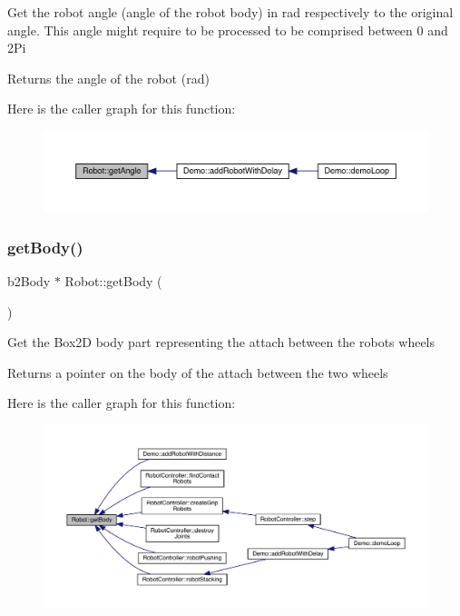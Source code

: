 Get the robot angle (angle of the robot body) in rad respectively to the original angle. This angle might require to be processed to be comprised between 0 and 2\+Pi \begin{DoxyReturn}{Returns}
the angle of the robot (rad) 
\end{DoxyReturn}
Here is the caller graph for this function\+:\nopagebreak
\begin{figure}[H]
\begin{center}
\leavevmode
\includegraphics[width=350pt]{class_robot_a41a470133819059706aab8a8d546f6bc_icgraph}
\end{center}
\end{figure}
\mbox{\label{class_robot_a0ccd9dbef98a3d5bf6b29d8cd781bd25}} 
\subsubsection{\texorpdfstring{get\+Body()}{getBody()}}
{\footnotesize\ttfamily b2\+Body $\ast$ Robot\+::get\+Body (\begin{DoxyParamCaption}{ }\end{DoxyParamCaption})}

Get the Box2D body part representing the attach between the robot\textquotesingle{}s wheels \begin{DoxyReturn}{Returns}
a pointer on the body of the attach between the two wheels 
\end{DoxyReturn}
Here is the caller graph for this function\+:\nopagebreak
\begin{figure}[H]
\begin{center}
\leavevmode
\includegraphics[width=350pt]{class_robot_a0ccd9dbef98a3d5bf6b29d8cd781bd25_icgraph}
\end{center}
\end{figure}
\mbox{\label{class_robot_af0254cdb4fd2d60279f7b6b12a12bc4e}} 
